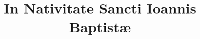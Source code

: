 \documentclass[17pt]{extarticle}
\begin{document}
\title{In Nativitate Sancti Ioannis Baptistæ}
\makereadingtitle

\end{document}
